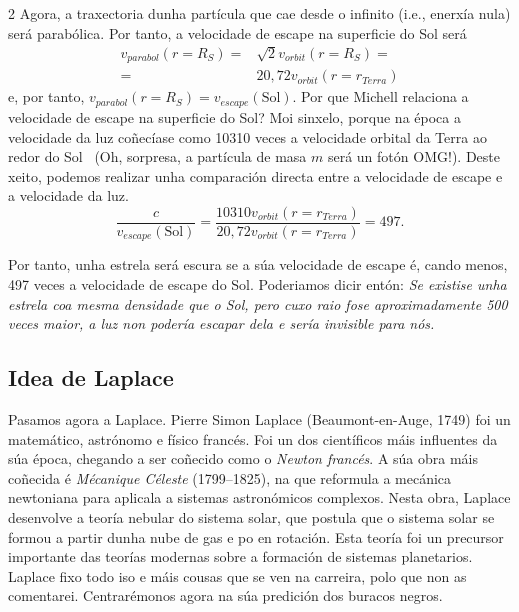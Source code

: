 \begin{multicols}{2}
Agora, a traxectoria dunha partícula que cae desde o infinito (i.e., enerxía
nula) será parabólica. Por tanto, a velocidade de escape na superficie do Sol
será
%
\begin{align}
    v_{parabol}(r=R_S) =& \sqrt{2} v_{orbit}(r=R_S) = \nonumber \\
    =& 20,72 v_{orbit}(r = r_{Terra})
\end{align}
%
e, por tanto, $v_{parabol}(r=R_S) = v_{escape}(\text{Sol})$. Por que Michell
relaciona a velocidade de escape na superficie do Sol? Moi sinxelo, porque na
época a velocidade da luz coñecíase como 10310 veces a velocidade orbital da
Terra ao redor do Sol~\cite{luz_bradley} (Oh, sorpresa, a partícula de masa
$m$ será un fotón {\large OMG}!). Deste xeito, podemos realizar unha
comparación directa entre a velocidade de escape e a velocidade da luz.
%
\begin{equation}
    \frac{c}{v_{escape}(\text{Sol})} = \frac{10310 v_{orbit}(r =
    r_{Terra})}{20,72 v_{orbit}(r = r_{Terra})} = 497.
\end{equation}

Por tanto, unha estrela será escura se a súa velocidade de escape é, cando
menos, 497 veces a velocidade de escape do Sol. Poderiamos dicir entón:
\emph{Se existise unha estrela coa mesma densidade que o Sol, pero cuxo raio
fose aproximadamente 500 veces maior, a luz non podería escapar dela e sería
invisible para nós.} %


\subsection*{Idea de Laplace}

Pasamos agora a Laplace. Pierre Simon Laplace (Beaumont-en-Auge, 1749) foi un
matemático, astrónomo e físico francés. Foi un dos científicos máis influentes
da súa época, chegando a ser coñecido como o \textit{Newton francés}. A súa
obra máis coñecida é \textit{Mécanique Céleste} (1799–1825), na que reformula a
mecánica newtoniana para aplicala a sistemas astronómicos complexos. Nesta
obra, Laplace desenvolve a teoría nebular do sistema solar, que postula que o
sistema solar se formou a partir dunha nube de gas e po en rotación. Esta
teoría foi un precursor importante das teorías modernas sobre a formación de
sistemas planetarios. Laplace fixo todo iso e máis cousas que se ven na
carreira, polo que non as comentarei. Centrarémonos agora na súa predición dos
buracos negros.


\end{multicols}
